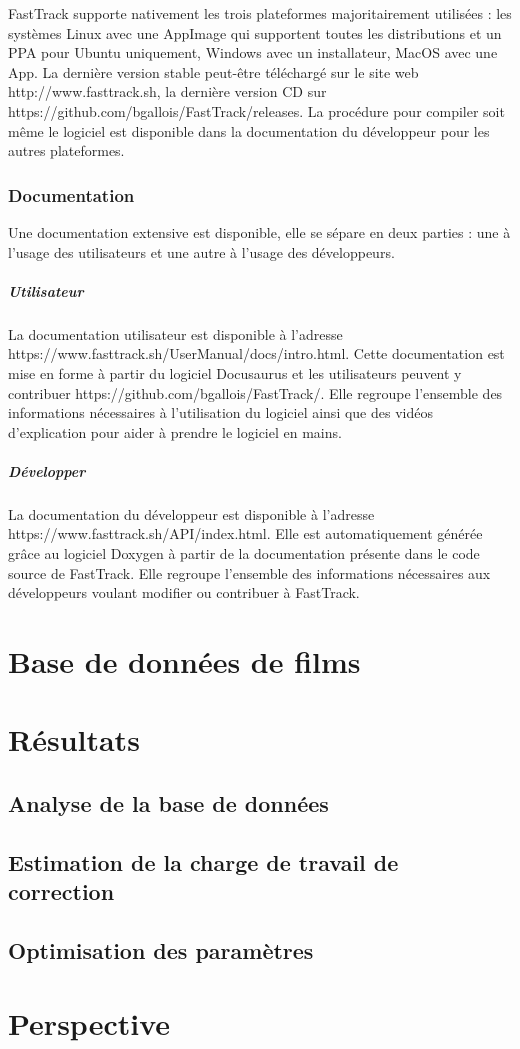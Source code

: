 		FastTrack supporte nativement les trois plateformes majoritairement utilisées : les systèmes Linux avec une AppImage qui supportent toutes les distributions et un PPA pour Ubuntu uniquement, Windows avec un installateur, MacOS avec une App. La dernière version stable peut-être téléchargé sur le site web http://www.fasttrack.sh, la dernière version CD sur https://github.com/bgallois/FastTrack/releases. La procédure pour compiler soit même le logiciel est disponible dans la documentation du développeur pour les autres plateformes.
		
		\subsection{Documentation}
		Une documentation extensive est disponible, elle se sépare en deux parties : une à l'usage des utilisateurs et une autre à l'usage des développeurs.
		
		\paragraph{Utilisateur} La documentation utilisateur est disponible à l'adresse https://www.fasttrack.sh/UserManual/docs/intro.html. Cette documentation est mise en forme à partir du logiciel Docusaurus et les utilisateurs peuvent y contribuer https://github.com/bgallois/FastTrack/. Elle regroupe l'ensemble des informations nécessaires à l'utilisation du logiciel ainsi que des vidéos d'explication pour aider à prendre le logiciel en mains.
		
		\paragraph{Développer} La documentation du développeur est disponible à l'adresse https://www.fasttrack.sh/API/index.html. Elle est automatiquement générée grâce au logiciel Doxygen à partir de la documentation présente dans le code source de FastTrack. Elle regroupe l'ensemble des informations nécessaires aux développeurs voulant modifier ou contribuer à FastTrack.

		
\chapter{Base de données de films}


\chapter{Résultats}

	\section{Analyse de la base de données}
	
	\section{Estimation de la charge de travail de correction}
	
	\section{Optimisation des paramètres}
	
	
\chapter{Perspective}